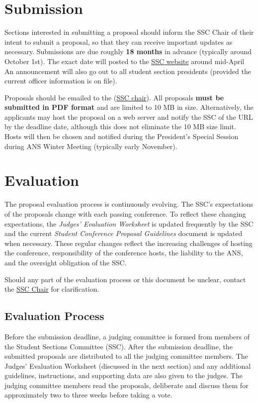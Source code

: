 \documentclass[12pt]{article}
\begin{document}
\newpage
\section{Submission}
Sections interested in submitting a proposal should inform the SSC Chair of their intent to submit a proposal, so that they can receive important updates as necessary.
Submissions are due roughly \textbf{18 months} in advance (typically around October 1st).
The exact date will posted to the \href{http://students.ans.org/THELINK}{SSC website} around mid-April
An announcement will also go out to all student section presidents (provided the current officer information is on file).

Proposals should be emailed to the (\href{mailto:sscChair@gmail.com}{SSC chair}).
All proposals \textbf{must be submitted in PDF format} and are limited to 10 MB in size.
Alternatively, the applicants may host the proposal on a web server and notify the SSC of the URL by the deadline date, although this does not eliminate the 10 MB size limit.
Hosts will then be chosen and notified during the President's Special Session during ANS Winter Meeting (typically early November).

\newpage
\section{Evaluation} \label{sec:Eval}
The proposal evaluation process is continuously evolving. The SSC’s expectations of the proposals change with each passing conference. To reflect these changing expectations, the \textit{Judges’ Evaluation Worksheet} is updated frequently by the SSC and the current \textit{Student Conference Proposal Guidelines} document is updated when necessary.
These regular changes reflect the increasing challenges of hosting the conference, responsibility of the conference hosts, the liability to the ANS, and the oversight obligation of the SSC.

Should any part of the evaluation process or this document be unclear, contact the \href{mailto:sscChair@gmail.com}{SSC Chair} for clarification.

\subsection{Evaluation Process}
Before the submission deadline, a judging committee is formed from members of the
Student Sections Committee (SSC). After the submission deadline, the submitted
proposals are distributed to all the judging committee members. The Judges’ Evaluation
Worksheet (discussed in the next section) and any additional guidelines, instructions, and supporting data are also given to the judges. The judging committee members read the proposals, deliberate and discuss them for approximately two to three weeks before
taking a vote.
\end{document}
